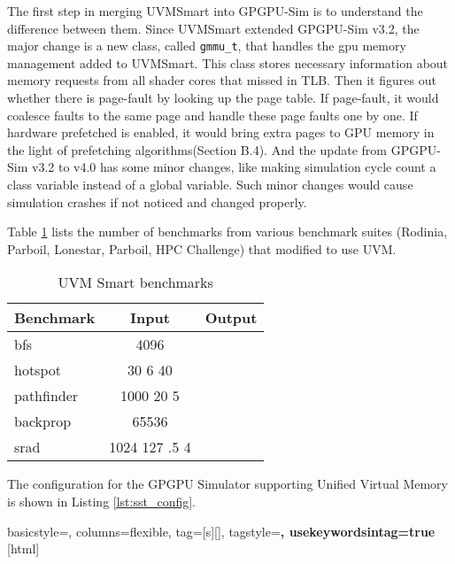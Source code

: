 The first step in merging UVMSmart into GPGPU-Sim is to understand the difference between them. Since UVMSmart extended GPGPU-Sim v3.2, the major change is a new class, called \texttt{gmmu\_t}, that handles the gpu memory management added to UVMSmart. This class stores necessary information about memory requests from all shader cores that missed in TLB. Then it figures out whether there is page-fault by looking up the page table. If page-fault, it would coalesce faults to the same page and handle these page faults one by one. If hardware prefetched is enabled, it would bring extra pages to GPU memory in the light of prefetching algorithms(Section B.4). And the update from GPGPU-Sim v3.2 to v4.0 has some minor changes, like making simulation cycle count a class variable instead of a global variable. Such minor changes would cause simulation crashes if not noticed and changed properly.

Table \ref{tab:uvm_tests} lists the number of benchmarks from various benchmark suites (Rodinia, Parboil, Lonestar, Parboil, HPC Challenge) that modified to use UVM.

    \begin{table}[!htbp]
        \centering
        \setlength{\abovecaptionskip}{6pt plus 1pt minus 1pt}
        \captionsetup{width=.75\textwidth}
        \caption {UVM Smart benchmarks}
            \begin{tabular}{|l|c|c|}
                \hline
                \textbf{Benchmark} & \textbf{Input} &  \textbf{Output}\\
                \hline
                bfs &  4096 & \\
                \hline
                hotspot & 30 6 40 & \\
                \hline
                pathfinder & 1000 20 5 & \\
                \hline
                backprop & 65536 & \\
                \hline
                srad & 1024 127 .5 4 & \\
                \hline
            \end{tabular}
        \label{tab:uvm_tests}

    \end{table}

 The configuration for the GPGPU Simulator supporting Unified Virtual Memory is shown in Listing \ref{lst:sst_config}.


{
  basicstyle={\small\ttfamily},
  columns=flexible,
  tag=[s]{[]},
  tagstyle=\color{dkgreen}\bfseries,
  usekeywordsintag=true
}[html]




